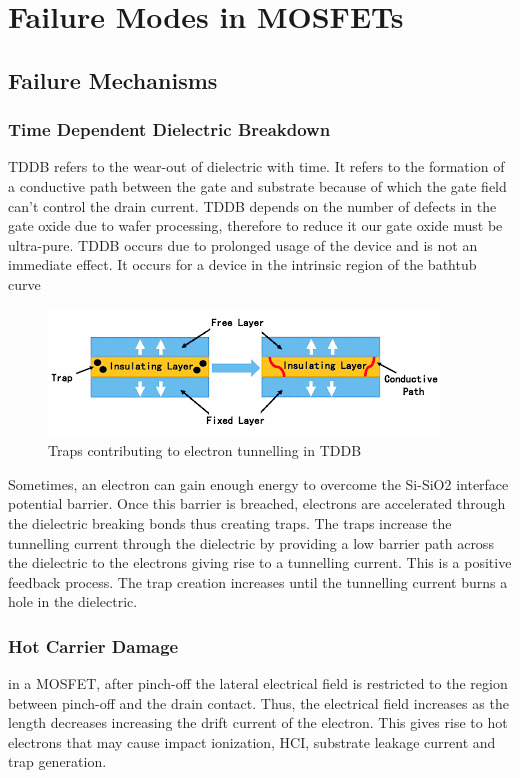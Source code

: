 \chapter{Failure Modes in MOSFETs}
\section{Failure Mechanisms}
\subsection{Time Dependent Dielectric Breakdown}
TDDB refers to the wear-out of dielectric with time. It refers to the formation of a conductive path between the gate and substrate because of which the gate field can’t control the drain current. TDDB depends on the number of defects in the gate oxide due to wafer processing, therefore to reduce it our gate oxide must be ultra-pure. TDDB occurs due to prolonged usage of the device and is not an immediate effect.  It occurs for a device in the intrinsic region of the bathtub curve

\begin{figure}[htb]
\centering
\includegraphics[scale=0.6]{./fig31} %
\caption{Traps contributing to electron tunnelling in TDDB}
\label{3.31} %
\end{figure}


\noindent Sometimes, an electron can gain enough energy to overcome the Si-SiO2 interface potential barrier. Once this barrier is breached, electrons are accelerated through the dielectric breaking bonds thus creating traps. The traps increase the tunnelling current through the dielectric by providing a low barrier path across the dielectric to the electrons giving rise to a tunnelling current. This is a positive feedback process. The trap creation increases until the tunnelling current burns a hole in the dielectric.
\subsection{Hot Carrier Damage}
in a MOSFET, after pinch-off the lateral electrical field is restricted to the region between pinch-off and the drain contact. Thus, the electrical field increases as the length decreases increasing the drift current of the electron. This gives rise to hot electrons that may cause impact ionization, HCI, substrate leakage current and trap generation. 
